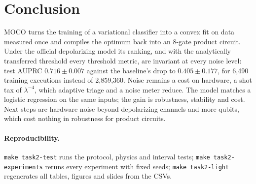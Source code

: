 \documentclass[10pt,twocolumn]{article}
\theoremstyle{definition}
\begin{document}
\section{Conclusion}

MOCO turns the training of a variational classifier into a convex fit on data measured once and compiles the
optimum back into an 8-gate product circuit. Under the official depolarizing model its ranking, and with the
analytically transferred threshold every threshold metric, are invariant at every noise level: test AUPRC
$0.716\pm0.007$ against the baseline's drop to $0.405\pm0.177$, for 6,490 training executions instead of 2,859,360.
Noise remains a cost on hardware, a shot tax of $\lambda^{-4}$, which adaptive triage and a noise meter reduce. The
model matches a logistic regression on the same inputs; the gain is robustness, stability and cost. Next steps are
hardware noise beyond depolarizing channels and more qubits, which cost nothing in robustness for product
circuits.

\paragraph{Reproducibility.} \texttt{make task2-test} runs the protocol, physics and interval tests;
\texttt{make task2-experiments} reruns every experiment with fixed seeds; \texttt{make task2-light} regenerates
all tables, figures and slides from the CSVs.


\end{document}
